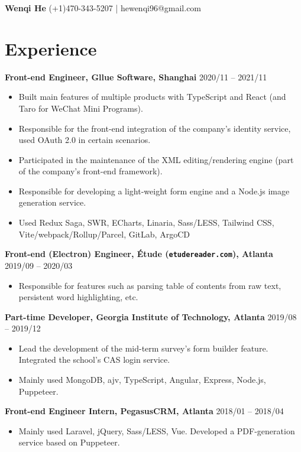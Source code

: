 \documentclass[9pt]{article}
\begin{document}
{\bf\huge Wenqi He} \hfill (+1)470-343-5207 | hewenqi96@gmail.com

\section*{Experience}
\textbf{Front-end Engineer, Gllue Software, Shanghai} \hfill 2020/11 -- 2021/11
\begin{itemize}
\item Built main features of multiple products with TypeScript and React (and Taro for WeChat Mini Programs).
\item Responsible for the front-end integration of the company's identity service, used OAuth 2.0 in certain scenarios.
\item Participated in the maintenance of the XML editing/rendering engine (part of the company's front-end framework).
\item Responsible for developing a light-weight form engine and a Node.js image generation service.
\item {\small Used Redux Saga, SWR, ECharts, Linaria, Sass/LESS, Tailwind CSS, Vite/webpack/Rollup/Parcel, GitLab, ArgoCD}
\end{itemize}

\vspace{0.5em}
\textbf{Front-end (Electron) Engineer, Étude (\texttt{etudereader.com}), Atlanta} \hfill 2019/09 -- 2020/03
\begin{itemize}
\item Responsible for features such as parsing table of contents from raw text, persistent word highlighting, etc.
\end{itemize}

\vspace{0.5em}
\textbf{Part-time Developer, Georgia Institute of Technology, Atlanta} \hfill 2019/08 -- 2019/12
\begin{itemize}
\item Lead the development of the mid-term survey's form builder feature. Integrated the school's CAS login service.
\item Mainly used MongoDB, ajv, TypeScript, Angular, Express, Node.js, Puppeteer.
\end{itemize}

\vspace{0.5em}
\textbf{Front-end Engineer Intern, PegasusCRM, Atlanta} \hfill 2018/01 -- 2018/04
\begin{itemize}
\item Mainly used Laravel, jQuery, Sass/LESS, Vue.  Developed a PDF-generation service based on Puppeteer.
\end{itemize}
\end{document}
